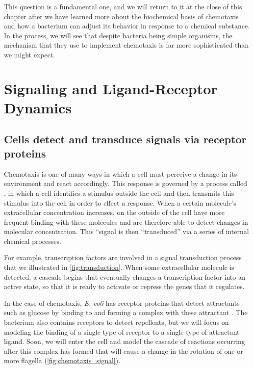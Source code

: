 This question is a fundamental one, and we will return to it at the close of this chapter after we have learned more about the biochemical basis of chemotaxis and how a bacterium can adjust its behavior in response to a chemical substance. In the process, we will see that despite bacteria being simple organisms, the mechanism that they use to implement chemotaxis is far more sophisticated than we might expect.\\


\FloatBarrier
{}
\section{Signaling and Ligand-Receptor Dynamics}
\label{sec:signal}

\subsection{Cells detect and transduce signals via receptor proteins}

Chemotaxis is one of many ways in which a cell must perceive a change in its environment and react accordingly. This response is governed by a process called , in which a cell identifies a stimulus outside the cell and then transmits this stimulus into the cell in order to effect a response. When a certain molecule's extracellular concentration increases,  on the outside of the cell have more frequent binding with these molecules and are therefore able to detect changes in molecular concentration. This ``signal is then ``transduced'' via a series of internal chemical processes.

For example, transcription factors are involved in a signal transduction process that we illustrated in \autoref{fig:transduction}. When some extracellular molecule is detected, a cascade begins that eventually changes a transcription factor into an active state, so that it is ready to activate or repress the genes that it regulates.

In the case of chemotaxis, \textit{E. coli} has receptor proteins that detect attractants such as glucose by binding to and forming a complex with these attractant . The bacterium also contains receptors to detect repellents, but we will focus on modeling the binding of a single type of receptor to a single type of attractant ligand. Soon, we will enter the cell and model the cascade of reactions occurring after this complex has formed that will cause a change in the rotation of one or more flagella (\autoref{fig:chemotaxis_signal}).\\

